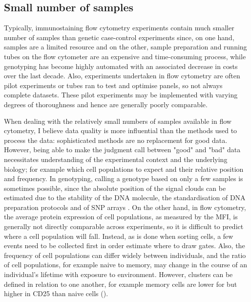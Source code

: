 \subsection{ Small number of samples }

Typically, immunostaining flow cytometry experiments contain much smaller number of samples than genetic case-control experiments since, on one hand, samples are a limited resource and on the other, sample preparation and running tubes on the flow cytometer are an expensive and time-consuming process, while genotyping has become highly automated with an associated decrease in costs over the last decade.
Also, experiments undertaken in flow cytometry are often pilot experiments or tubes ran to test and optimise panels, so not always complete datasets.
These pilot experiments may be implemented with varying degrees of thoroughness and hence are generally poorly comparable.

When dealing with the relatively small numbers of samples available in flow cytometry, I believe data quality is more influential than the methods used to process the data: sophisticated methods are no replacement for good data.
However, being able to make the judgment call between "good" and "bad" data necessitates understanding of the experimental context and the underlying biology; for example which cell populations to expect and their relative position and frequency.
In genotyping, calling a genotype based on only a few samples is sometimes possible, since the absolute position of the signal clouds can be estimated due to the stability of the DNA molecule, the standardisation of DNA preparation protocols and of SNP arrays \citep{Di:2005uj,Giannoulatou:2008ty}.
On the other hand, in flow cytometry, the average protein expression of cell populations, as measured by the \gls{MFI}, is generally not directly comparable across experiments, so it is difficult to predict where a cell population will fall.
Instead, as is done when sorting cells, a few events need to be collected first in order estimate where to draw gates.
Also, the frequency of cell populations can differ widely between individuals, and the ratio of cell populations, for example naive to memory, may change in the course of an individual's lifetime with exposure to environment. 
However, clusters can be defined in relation to one another, for example memory cells are lower for  but higher in CD25 than naive cells ().

